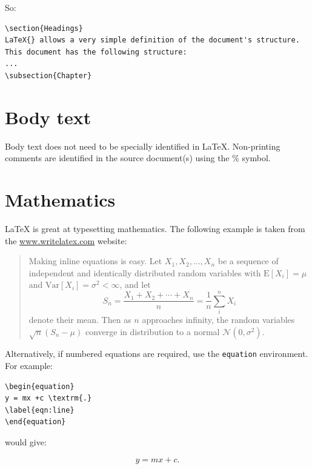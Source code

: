 So: 

\begin{verbatim}
\section{Headings}
LaTeX{} allows a very simple definition of the document's structure. 
This document has the following structure:
...
\subsection{Chapter}

\end{verbatim}

\section{Body text}
Body text does not need to be specially identified in LaTeX{}. Non-printing comments are identified in the source document(s) using the \% symbol.

\section{Mathematics}

LaTeX is great at typesetting mathematics. The following example is taken from the \href{www.writelatex.com}{www.writelatex.com} website:

\begin{quote}
Making inline equations is easy. Let $X_1, X_2, \ldots, X_n$ be a sequence of independent and identically distributed random variables with $\textrm{E}[X_i] = \mu$ and $\textrm{Var}[X_i] = \sigma^2 < \infty$, and let
$$S_n = \frac{X_1 + X_2 + \cdots + X_n}{n}
 = \frac{1}{n}\sum_{i}^{n} X_i$$
denote their mean. Then as $n$ approaches infinity, the random variables $\sqrt{n}(S_n - \mu)$ converge in distribution to a normal $\mathcal{N}(0, \sigma^2)$.
\end{quote}

Alternatively, if numbered equations are required, use the \texttt{equation} environment. For example:

\begin{verbatim}
\begin{equation}
y = mx +c \textrm{.}
\label{eqn:line}
\end{equation}
\end{verbatim}

would give:

\begin{equation}
y = mx+c \textrm{.}
\label{eqn:line}
\end{equation}

